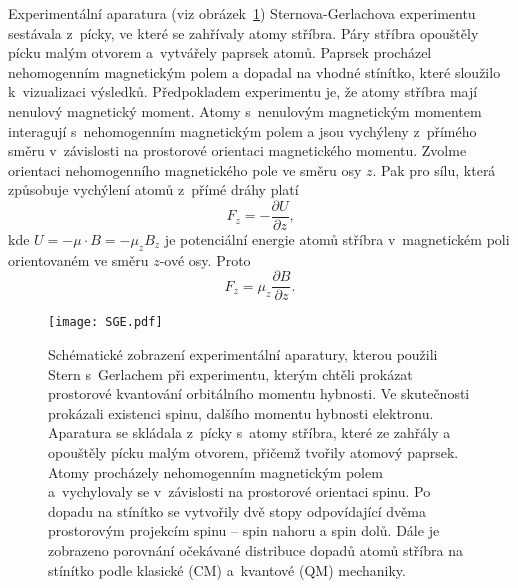 Experimentální aparatura (viz obrázek~\ref{obr:SCH-experiment}) Sternova-Gerlachova experimentu sestávala z~pícky, ve které se zahřívaly atomy stříbra. Páry stříbra opouštěly pícku malým otvorem a~vytvářely paprsek atomů. Paprsek procházel nehomogenním magnetickým polem a dopadal na vhodné stínítko, které sloužilo k~vizualizaci výsledků. Předpokladem experimentu je, že atomy stříbra mají nenulový magnetický moment. Atomy s~nenulovým magnetickým momentem interagují s~nehomogenním magnetickým polem a jsou vychýleny z~přímého směru v~závislosti na prostorové orientaci magnetického momentu. Zvolme orientaci nehomogenního magnetického pole ve směru osy $z$. Pak pro sílu, která způsobuje vychýlení atomů z~přímé dráhy platí
\begin{equation}
F_z = - \frac{\partial U}{\partial z } \mbox{,}
\label{rov:Spin5}
\end{equation}
kde $U = - \mu \cdot B = - \mu_z B_z$ je potenciální energie atomů stříbra v~magnetickém poli orientovaném ve směru $z$-ové osy. Proto 
\begin{equation}
F_z = \mu_z \frac{\partial B}{\partial z } \mbox{.}
\label{rov:Spin6}
\end{equation}

\begin{figure} [!ht]
\centering
\texttt{[image: SGE.pdf]}
\caption[Sternův-Gerlachův experiment]{Schématické zobrazení experimentální aparatury, kterou použili Stern s~Gerlachem při experimentu, kterým chtěli prokázat prostorové kvantování orbitálního momentu hybnosti. Ve skutečnosti prokázali existenci spinu, dalšího momentu hybnosti elektronu. Aparatura se skládala z~pícky s~atomy stříbra, které ze zahřály a opouštěly pícku malým otvorem, přičemž tvořily atomový paprsek. Atomy procházely nehomogenním magnetickým polem a~vychylovaly se v~závislosti na prostorové orientaci spinu. Po dopadu na stínítko se vytvořily dvě stopy odpovídající dvěma prostorovým projekcím spinu -- spin nahoru a spin dolů. Dále je zobrazeno porovnání očekávané distribuce dopadů atomů stříbra na stínítko podle klasické (CM) a~kvantové (QM) mechaniky.}
\label{obr:SCH-experiment}
\end{figure}


